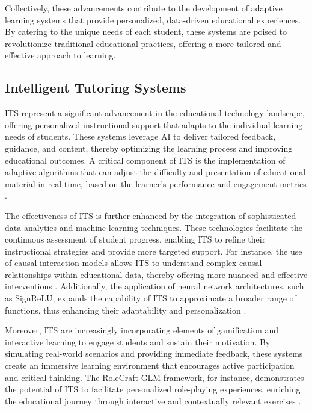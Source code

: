 Collectively, these advancements contribute to the development of adaptive learning systems that provide personalized, data-driven educational experiences. By catering to the unique needs of each student, these systems are poised to revolutionize traditional educational practices, offering a more tailored and effective approach to learning.


\subsection{Intelligent Tutoring Systems} \label{subsec:ITS}



ITS represent a significant advancement in the educational technology landscape, offering personalized instructional support that adapts to the individual learning needs of students. These systems leverage AI to deliver tailored feedback, guidance, and content, thereby optimizing the learning process and improving educational outcomes. A critical component of ITS is the implementation of adaptive algorithms that can adjust the difficulty and presentation of educational material in real-time, based on the learner's performance and engagement metrics .



The effectiveness of ITS is further enhanced by the integration of sophisticated data analytics and machine learning techniques. These technologies facilitate the continuous assessment of student progress, enabling ITS to refine their instructional strategies and provide more targeted support. For instance, the use of causal interaction models allows ITS to understand complex causal relationships within educational data, thereby offering more nuanced and effective interventions \cite{meek2015structureparameterlearningcausal}. Additionally, the application of neural network architectures, such as SignReLU, expands the capability of ITS to approximate a broader range of functions, thus enhancing their adaptability and personalization \cite{li2023signreluneuralnetworkapproximation}.



Moreover, ITS are increasingly incorporating elements of gamification and interactive learning to engage students and sustain their motivation. By simulating real-world scenarios and providing immediate feedback, these systems create an immersive learning environment that encourages active participation and critical thinking. The RoleCraft-GLM framework, for instance, demonstrates the potential of ITS to facilitate personalized role-playing experiences, enriching the educational journey through interactive and contextually relevant exercises \cite{tao2024rolecraftglmadvancingpersonalizedroleplaying}.




